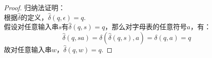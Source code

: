 \begin{proof}
    归纳法证明：\\
    根据$\hat\delta$的定义，$\hat\delta(q,\epsilon)=q$.\\
    假设对任意输入串$s$有$\hat\delta(q,s)=q$，那么对字母表的任意符号$a$，有：
    $$\hat\delta(q,sa)=\delta(\hat\delta(q,s),a)=\delta(q,a)=q$$
    故对任意输入串$w$，$\hat\delta(q,w)=q$.
\end{proof}